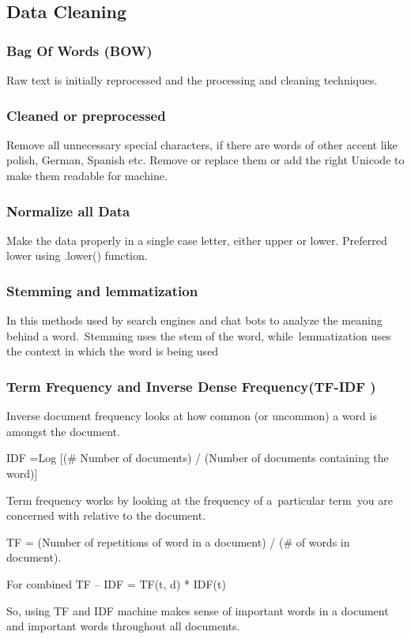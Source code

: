 \subsection{Data Cleaning}
\subsubsection{Bag Of Words (BOW)}
Raw text is initially reprocessed and the processing and cleaning techniques.
\subsubsection{Cleaned or preprocessed }
Remove all unnecessary special characters, if there are words of other accent like polish, German, Spanish etc. Remove or replace them or add the right Unicode to make them readable for machine. 
\subsubsection{Normalize all Data}
Make the data properly in a single case letter, either upper or lower. Preferred lower using .lower() function.
\subsubsection{Stemming and lemmatization}
In this methods used by search engines and chat bots to analyze the meaning behind a word. Stemming uses the stem of the word, while lemmatization uses the context in which the word is being used

\subsubsection{Term Frequency and Inverse Dense Frequency(TF-IDF )}

Inverse document frequency looks at how common (or uncommon) a word is amongst the document.

IDF =Log [(\# Number of documents) / (Number of documents containing the word)]

Term frequency works by looking at the frequency of a particular term you are concerned with relative to the document.

	 TF = (Number of repetitions of word in a document) / (\# of words in document).
  
For combined TF – IDF = TF(t, d) * IDF(t)

So, using TF and IDF machine makes sense of important words in a document and important words throughout all documents.

